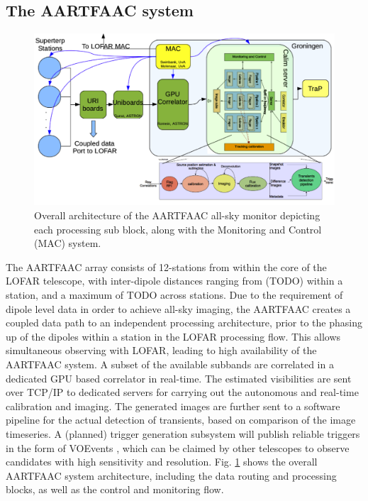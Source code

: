 \documentclass{ws-jai}
\begin{document}
\subsection {\label{subsec:aartfaac}  The AARTFAAC system}
\begin{figure}[htbp]
\centering
\includegraphics[width=1\textwidth]{Figs/overall_afaac_Arch_blks.png}
\caption {Overall  architecture of the  AARTFAAC all-sky monitor  depicting each
  processing sub block, along with the Monitoring and Control (MAC) system. }
\label{fig:afaac_arch}
\end{figure}

The AARTFAAC  array consists of  12-stations from within  the core of  the LOFAR
telescope, with inter-dipole distances ranging  from (TODO) within a station, and
a maximum of TODO across stations.  Due  to the requirement of dipole level data
in order to achieve all-sky imaging, the AARTFAAC creates a coupled data path to
an independent processing  architecture, prior to the phasing up  of the dipoles
within  a  station in  the  LOFAR  processing  flow.  This  allows  simultaneous
observing with  LOFAR, leading to  high availability  of the AARTFAAC  system. A
subset  of the  available  subbands  are correlated  in  a  dedicated GPU  based
correlator in  real-time.  The  estimated visibilities are  sent over  TCP/IP to
dedicated servers for carrying out  the autonomous and real-time calibration and
imaging.  The generated  images are further sent to a  software pipeline for the
actual detection of transients, based on  comparison of the image timeseries.  A
(planned) trigger  generation subsystem  will publish  reliable triggers  in the
form  of VOEvents  \cite{williams2006voevent},  which can  be  claimed by  other
telescopes    to    observe    candidates     with    high    sensitivity    and
resolution.  Fig.   \ref{fig:afaac_arch}  shows  the  overall   AARTFAAC  system
architecture, including the  data routing and processing blocks, as  well as the
control and monitoring flow.
\end{document}
